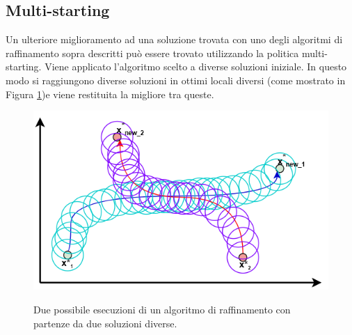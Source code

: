 \subsection{Multi-starting}
Un ulteriore miglioramento ad una soluzione trovata con uno degli algoritmi di raffinamento sopra descritti può essere trovato utilizzando la politica multi-starting. Viene applicato l'algoritmo scelto a diverse soluzioni iniziale. In questo modo si raggiungono diverse soluzioni in ottimi locali diversi (come mostrato in Figura \ref{multi_starting})e viene restituita la migliore tra queste. 
\begin{figure}[h] 
\begin{center} 
  \includegraphics[scale=0.5]{Images/multistarting}\\ 
  \caption{\footnotesize{Due possibile esecuzioni di un algoritmo di raffinamento con partenze da due soluzioni diverse.}}
  \label{multi_starting}
\end{center}
\end{figure}
